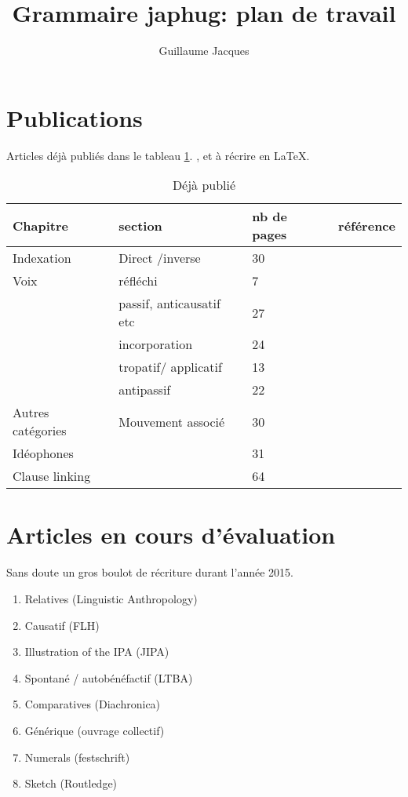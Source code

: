 \documentclass[oldfontcommands,oneside,a4paper,11pt]{article}
\begin{document}
 
 
\title{Grammaire japhug: plan de travail}
 
\author{Guillaume Jacques}
\maketitle
 
 
 \section{Publications}
Articles déjà publiés dans le tableau \ref{tab:ecrit}. \citet{jacques10inverse}, \citet{jacques10refl} et \citet{jacques12demotion} à récrire en \LaTeX.
 
\begin{table}
\caption{Déjà publié} \label{tab:ecrit} \centering
\begin{tabular}{llll}
\toprule
Chapitre &section& nb de pages & référence \\
\midrule
Indexation & Direct /inverse&30 & \citet{jacques10inverse}\\
Voix &réfléchi &7 & \citet{jacques10refl} \\
&passif, anticausatif etc &27 & \citet{jacques12demotion} \\
&incorporation & 24& \citet{jacques12incorp} \\
&tropatif/ applicatif &13 & \citet{jacques13tropative} \\
&antipassif &22 & \citet{jacques14antipassive} \\
Autres catégories & Mouvement associé  & 30&\citet{jacques13harmonization} \\
Idéophones & &31 &\citet{japhug14ideophones} \\
Clause linking & &64 &\citet{jacques14linking} \\
\bottomrule
\end{tabular}
\end{table} 


 
\section{Articles en cours d'évaluation} \label{sec:eval}
Sans doute un gros boulot de récriture durant l'année 2015.
\begin{enumerate}
\item Relatives (Linguistic Anthropology)
\item Causatif (FLH)
\item Illustration of the IPA (JIPA)
\item Spontané / autobénéfactif (LTBA)
\item Comparatives (Diachronica)
\item Générique (ouvrage collectif)
\item Numerals (festschrift)
\item Sketch (Routledge)
\end{enumerate} 
 
\end{document}

